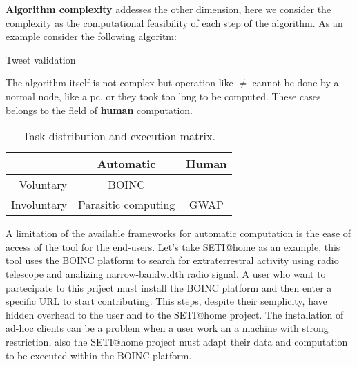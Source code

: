 \textbf{Algorithm complexity} addesses the other dimension, here we consider the
complexity as the computational feasibility of each step of the algorithm.
As an example consider the following algoritm:\\
\begin{algorithm}[H]
	\caption{Tweet validation}
	\label{alg:intro_example}

	\BlankLine

\end{algorithm}
The algorithm itself is not complex but operation like  $\ne$
cannot be done by a normal node, like a pc, or they took too long to be computed.
These cases belongs to the field of \textbf{human} computation.\\
\begin{table}[htb]
	\caption{Task distribution and execution matrix.}
	\label{tab:matrix}
	\centering
	\begin{tabular}{r|c|c}
		 & \textbf{Automatic} & \textbf{Human}\\
		\hline
		Voluntary & \acs{BOINC} & \citetitle{turk}\\
		\hline
		Involuntary & Parasitic computing & \acs{GWAP}
	\end{tabular}
\end{table}



A limitation of the available frameworks for automatic computation is the ease
of access of the tool for the end-users. Let's take \ac{SETI@home} as an example,
this tool uses the \ac{BOINC} platform to search for extraterrestral activity
using radio telescope and analizing narrow-bandwidth radio signal.
A user who want to partecipate to this priject must install the \ac{BOINC}
platform and then enter a specific URL to start contributing.
This steps, despite their semplicity, have hidden overhead to the user and to
the \ac{SETI@home} project. The installation of ad-hoc clients can be a problem
when a user work an a machine with strong restriction, also the \ac{SETI@home}
project must adapt their data and computation to be executed within the \ac{BOINC}
platform.


